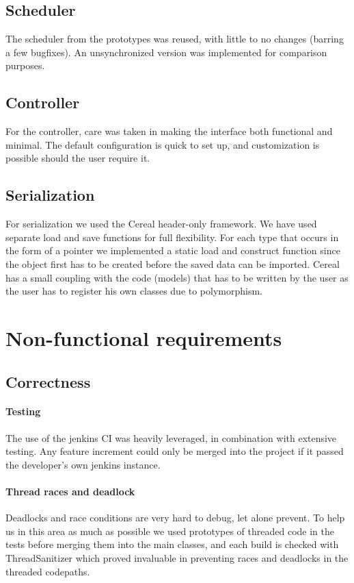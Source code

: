 \documentclass[8pt,a4paper]{report}
\begin{document}
\section{Scheduler}
The scheduler from the prototypes was reused, with little to no changes (barring a few bugfixes). An unsynchronized version was implemented for comparison purposes.

\section{Controller}
For the controller, care was taken in making the interface both functional and minimal. The default configuration is quick to set up, and customization is possible should the user require it.

\section{Serialization}
For serialization we used the Cereal \cite{cereal} header-only framework. We have used separate load and save functions for full flexibility. For each type that occurs in the form of a pointer we implemented a static load and construct function since the object first has to be created before the saved data can be imported. Cereal has a small coupling with the code (models) that has to be written by the user as the user has to register his own classes due to polymorphism.

\chapter{Non-functional requirements}
\section{Correctness}
\subsubsection{Testing}
The use of the jenkins CI was heavily leveraged, in combination with extensive testing. Any feature increment could only be merged into the project if it passed the developer's own jenkins instance.
\subsubsection{Thread races and deadlock}
Deadlocks and race conditions are very hard to debug, let alone prevent. To help us in this area as much as possible we used prototypes of threaded code in the tests before merging them into the main classes, and each build is checked with ThreadSanitizer \cite{tsan} which proved invaluable in preventing races and deadlocks in the threaded codepaths.
\end{document}
